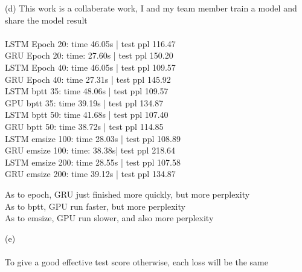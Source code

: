 \documentclass{article}
\begin{document}
\item (d)  This work is  a collaberate work, I and my team member train a model and share the model result
\\
\\
LSTM Epoch 20: time 46.05s | test ppl   116.47
\\
GRU Epoch 20: time: 27.60s | test ppl    150.20
\\
LSTM Epoch 40: time 46.05s | test ppl   109.57
\\
GRU Epoch 40: time 27.31s  | test ppl 145.92
\\
LSTM bptt 35: time 48.06s | test ppl   109.57
\\
GPU bptt 35: time 39.19s | test ppl   134.87
\\
LSTM bptt 50: time 41.68s  | test ppl   107.40
\\
GRU bptt 50: time 38.72s | test ppl 114.85
\\
LSTM emsize 100: time 28.03s | test ppl  108.89
\\
GRU emsize 100: time: 38.38s| test ppl   218.64
\\
LSTM emsize 200: time 28.55s | test ppl   107.58
\\
GRU emsize 200: time 39.12s  | test ppl 134.87

As to epoch, GRU just finished more quickly, but more perplexity\\

As to bptt, GPU run faster, but more perplexity\\

As to emsize, GPU run slower, and also more perplexity
\item (e)
\\
\\
To give a good effective test score otherwise, each loss will be the same
\end{document}
